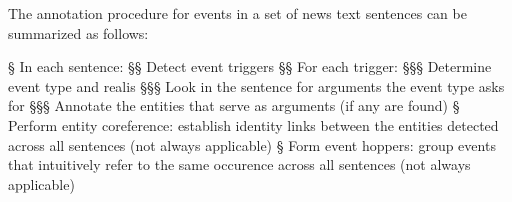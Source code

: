 The annotation procedure for events in a set of news text sentences can be summarized as follows:

\bigskip
\begin{easylist}[enumerate]
    § In each sentence:
        §§ Detect event triggers
        §§ For each trigger:
            §§§ Determine event type and realis
            §§§ Look in the sentence for arguments the event type asks for
            §§§ Annotate the entities that serve as arguments (if any are found)
    § Perform entity coreference: establish identity links between the entities detected across all sentences (not always applicable)
    § Form event hoppers: group events that intuitively refer to the same occurence across all sentences (not always applicable)
\end{easylist}
\bigskip

